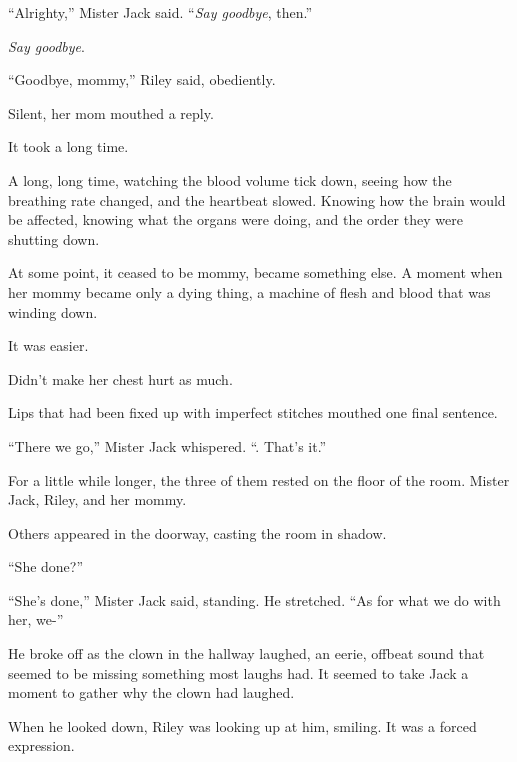 ``Alrighty,'' Mister Jack said.  ``\emph{Say goodbye}, then.''



\emph{Say goodbye}.



``Goodbye, mommy,'' Riley said, obediently.



Silent, her mom mouthed a reply.



It took a long time.



A long, long time, watching the blood volume tick down, seeing how the breathing rate changed, and the heartbeat slowed.  Knowing how the brain would be affected, knowing what the organs were doing, and the order they were shutting down.



At some point, it ceased to be mommy, became something else.  A moment when her mommy became only a dying thing, a machine of flesh and blood that was winding down.



It was easier.



Didn't make her chest hurt as much.



Lips that had been fixed up with imperfect stitches mouthed one final sentence.



``There we go,'' Mister Jack whispered.  ``\ldotsThere.  That's it.''



For a little while longer, the three of them rested on the floor of the room.  Mister Jack, Riley, and her mommy.



Others appeared in the doorway, casting the room in shadow.



``She done?''



``She's done,'' Mister Jack said, standing.  He stretched.  ``As for what we do with her, we-''



He broke off as the clown in the hallway laughed, an eerie, offbeat sound that seemed to be missing something most laughs had.  It seemed to take Jack a moment to gather why the clown had laughed.



When he looked down, Riley was looking up at him, smiling.  It was a forced expression.



